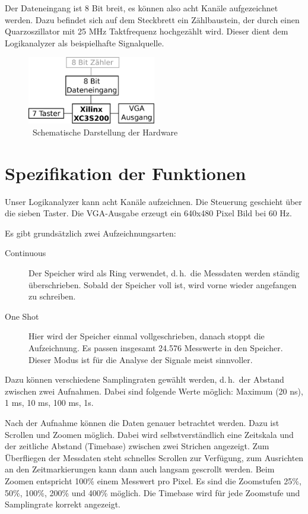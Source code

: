 \documentclass[IN,ngerman,utf8,12pt]{tumbook}
\newcommand{\dah}{d.\,h.\ }
\begin{document}
Der Dateneingang ist 8 Bit breit, es können also acht Kanäle aufgezeichnet werden.
Dazu befindet sich auf dem Steckbrett ein Zählbaustein, der durch einen Quarzoszillator mit 25 MHz Taktfrequenz hochgezählt wird.
Dieser dient dem Logikanalyzer als beispielhafte Signalquelle.

\begin{figure}
    \centerline{
        \includegraphics[width=0.5\textwidth]{img/hardware}
    }
    \caption{\ Schematische Darstellung der Hardware}
\end{figure}

\chapter{Spezifikation der Funktionen}

Unser Logikanalyzer kann acht Kanäle aufzeichnen.
Die Steuerung geschieht über die sieben Taster.
Die VGA-Ausgabe erzeugt ein 640x480 Pixel Bild bei 60 Hz.

Es gibt grundsätzlich zwei Aufzeichnungsarten:

\begin{description}
    \item[Continuous] Der Speicher wird als Ring verwendet, \dah die Messdaten werden ständig überschrieben.
        Sobald der Speicher voll ist, wird vorne wieder angefangen zu schreiben.
    \item[One Shot] Hier wird der Speicher einmal vollgeschrieben, danach stoppt die Aufzeichnung.
        Es passen insgesamt 24.576 Messwerte in den Speicher.
        Dieser Modus ist für die Analyse der Signale meist sinnvoller.
\end{description}

Dazu können verschiedene Samplingraten gewählt werden, \dah der Abstand zwischen zwei Aufnahmen.
Dabei sind folgende Werte möglich: Maximum (20 ns), 1 ms, 10 ms, 100 ms, 1s.

Nach der Aufnahme können die Daten genauer betrachtet werden.
Dazu ist Scrollen und Zoomen möglich.
Dabei wird selbstverständlich eine Zeitskala und der zeitliche Abstand (Timebase) zwischen zwei Strichen angezeigt.
Zum Überfliegen der Messdaten steht schnelles Scrollen zur Verfügung, zum Ausrichten an den Zeitmarkierungen kann dann auch langsam gescrollt werden.
Beim Zoomen entspricht 100\% einem Messwert pro Pixel.
Es sind die Zoomstufen 25\%, 50\%, 100\%, 200\% und 400\% möglich.
Die Timebase wird für jede Zoomstufe und Samplingrate korrekt angezeigt.
\end{document}
